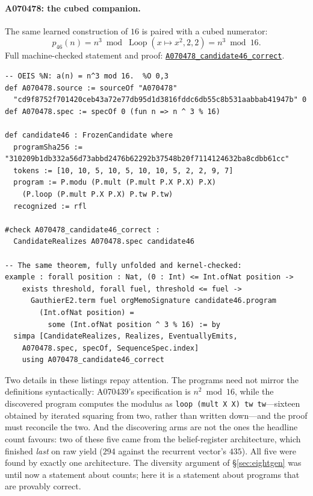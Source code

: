\documentclass[11pt]{article}
\newcommand{\code}[1]{\texttt{#1}}
\newcommand{\formalcommit}{f3a31db36bb2f944312ee31c1d86c2758109e83a}
\newcommand{\formalblob}{https://github.com/zariuq/MeTTapedia/blob/\formalcommit/lean/mettapedia/Mettapedia}
\newcommand{\leansource}[3]{%
  \href{\formalblob/#1\#L#2}{\nolinkurl{#3}}}
\begin{document}
\paragraph{A070478: the cubed companion.}
The same learned construction of $16$ is paired with a cubed numerator:
\[
 p_{46}(n)=n^3\bmod\operatorname{Loop}(x\mapsto x^2,2,2)
          =n^3\bmod16.
\]
\noindent Full machine-checked statement and proof:
\leansource{GSLT/LanguageDef/Gauthier/Adjudications33.lean}{197-L221}{A070478_candidate46_correct}.
\begin{lstlisting}[caption={A070478, discovered exclusively by the recurrent-vector arm
in world 1, generation 2. Its 96 published terms become a universal stable-evaluation
claim.}]
-- OEIS %N: a(n) = n^3 mod 16.  %O 0,3
def A070478.source := sourceOf "A070478"
  "cd9f8752f701420ceb43a72e77db95d1d3816fddc6db55c8b531aabbab41947b" 0
def A070478.spec := specOf 0 (fun n => n ^ 3 % 16)

def candidate46 : FrozenCandidate where
  programSha256 := "310209b1db332a56d73abbd2476b62292b37548b20f7114124632ba8cdbb61cc"
  tokens := [10, 10, 5, 10, 5, 10, 10, 5, 2, 2, 9, 7]
  program := P.modu (P.mult (P.mult P.X P.X) P.X)
    (P.loop (P.mult P.X P.X) P.tw P.tw)
  recognized := rfl

#check A070478_candidate46_correct :
  CandidateRealizes A070478.spec candidate46

-- The same theorem, fully unfolded and kernel-checked:
example : forall position : Nat, (0 : Int) <= Int.ofNat position ->
    exists threshold, forall fuel, threshold <= fuel ->
      GauthierE2.term fuel orgMemoSignature candidate46.program
        (Int.ofNat position) =
          some (Int.ofNat position ^ 3 % 16) := by
  simpa [CandidateRealizes, Realizes, EventuallyEmits,
    A070478.spec, specOf, SequenceSpec.index]
    using A070478_candidate46_correct
\end{lstlisting}

Two details in these listings repay attention. The programs need not mirror the definitions
syntactically: A070439's specification is $n^{2} \bmod 16$, while the discovered program
computes the modulus as \code{loop (mult X X) tw tw}---sixteen obtained by iterated
squaring from two, rather than written down---and the proof must reconcile the two.
And the discovering arms are not the ones the headline count favours: two of these five
came from the belief-register architecture, which finished \emph{last} on raw yield
($294$ against the recurrent vector's $435$). All five were found by exactly one
architecture. The diversity argument of \S\ref{sec:eightgen} was until now a statement
about counts; here it is a statement about programs that are provably correct.
\end{document}
